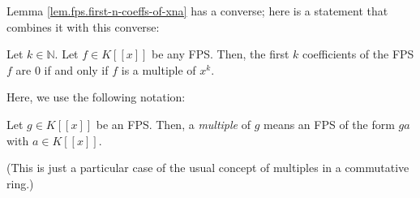 Lemma \ref{lem.fps.first-n-coeffs-of-xna} has a converse; here is a statement
that combines it with this converse:

\begin{lemma}
\label{lem.fps.muls-of-xn}Let $k\in\mathbb{N}$. Let $f\in K\left[  \left[
x\right]  \right]  $ be any FPS. Then, the first $k$ coefficients of the FPS
$f$ are $0$ if and only if $f$ is a multiple of $x^{k}$.
\end{lemma}

Here, we use the following notation:

\begin{definition}
Let $g\in K\left[  \left[  x\right]  \right]  $ be an FPS. Then, a
\emph{multiple} of $g$ means an FPS of the form $ga$ with $a\in K\left[
\left[  x\right]  \right]  $.
\end{definition}

(This is just a particular case of the usual concept of multiples in a
commutative ring.)

